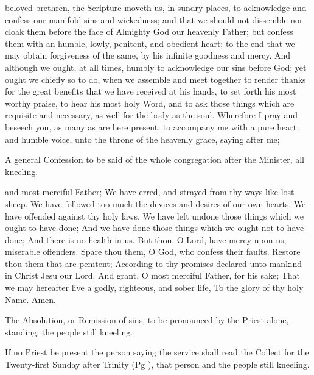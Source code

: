 
 beloved brethren, the Scripture moveth us, in sundry places, to acknowledge and confess our manifold sins and wickedness; and that we should not dissemble nor cloak them before the face of Almighty God our heavenly Father; but confess them with an humble, lowly, penitent, and obedient heart; to the end that we may obtain forgiveness of the same, by his infinite goodness and mercy. And although we ought, at all times, humbly to acknowledge our sins before God; yet ought we chiefly so to do, when we assemble and meet together to render thanks for the great benefits that we have received at his hands, to set forth his most worthy praise, to hear his most holy Word, and to ask those things which are requisite and necessary, as well for the body as the soul. Wherefore I pray and beseech you, as many as are here present, to accompany me with a pure heart, and humble voice, unto the throne of the heavenly grace, saying after me;

\begin{rubric}
A general Confession to be said of the whole congregation after the Minister, all kneeling.
\end{rubric}

 and most merciful Father; We have erred, and strayed from thy ways like lost sheep. We have followed too much the devices and desires of our own hearts. We have offended against thy holy laws. We have left undone those things which we ought to have done; And we have done those things which we ought not to have done; And there is no health in us. But thou, O Lord, have mercy upon us, miserable offenders. Spare thou them, O God, who confess their faults. Restore thou them that are penitent; According to thy promises declared unto mankind in Christ Jesu our Lord. And grant, O most merciful Father, for his sake; That we may hereafter live a godly, righteous, and sober life, To the glory of thy holy Name. Amen.

\newpage

\begin{rubric}
The Absolution, or Remission of sins, to be pronounced by the Priest alone, standing; the people still kneeling.

If no Priest be present the person saying the service shall read the Collect for the Twenty-first Sunday after Trinity (Pg \pageref{collect-trinity-21}), that person and the people still kneeling.
\end{rubric}


